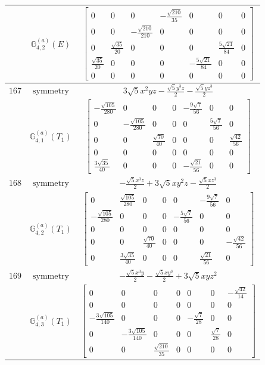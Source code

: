 \documentclass[fleqn,8pt,landscape]{jsarticle}
\begin{document}
\begin{longtable}{ccc}
$  $ & $ \mathbb{G}_{4,2}^{(a)}(E) $ & $ \begin{bmatrix} 0 & 0 & 0 & - \frac{\sqrt{210}}{35} & 0 & 0 & 0 \\ 0 & 0 & - \frac{\sqrt{210}}{210} & 0 & 0 & 0 & 0 \\ 0 & \frac{\sqrt{35}}{20} & 0 & 0 & 0 & \frac{5 \sqrt{21}}{84} & 0 \\ \frac{\sqrt{35}}{20} & 0 & 0 & 0 & - \frac{5 \sqrt{21}}{84} & 0 & 0 \\ 0 & 0 & 0 & 0 & 0 & 0 & 0 \end{bmatrix} $ \\ \hline
$ 167 $ & $ \text{symmetry} $ & $ 3 \sqrt{5} x^{2} y z - \frac{\sqrt{5} y^{3} z}{2} - \frac{\sqrt{5} y z^{3}}{2} $ \\
$  $ & $ \mathbb{G}_{4,1}^{(a)}(T_{1}) $ & $ \begin{bmatrix} - \frac{\sqrt{105}}{280} & 0 & 0 & 0 & - \frac{9 \sqrt{7}}{56} & 0 & 0 \\ 0 & - \frac{\sqrt{105}}{280} & 0 & 0 & 0 & \frac{5 \sqrt{7}}{56} & 0 \\ 0 & 0 & \frac{\sqrt{70}}{40} & 0 & 0 & 0 & \frac{\sqrt{42}}{56} \\ 0 & 0 & 0 & 0 & 0 & 0 & 0 \\ \frac{3 \sqrt{35}}{40} & 0 & 0 & 0 & - \frac{\sqrt{21}}{56} & 0 & 0 \end{bmatrix} $ \\ \hline
$ 168 $ & $ \text{symmetry} $ & $ - \frac{\sqrt{5} x^{3} z}{2} + 3 \sqrt{5} x y^{2} z - \frac{\sqrt{5} x z^{3}}{2} $ \\
$  $ & $ \mathbb{G}_{4,2}^{(a)}(T_{1}) $ & $ \begin{bmatrix} 0 & \frac{\sqrt{105}}{280} & 0 & 0 & 0 & - \frac{9 \sqrt{7}}{56} & 0 \\ - \frac{\sqrt{105}}{280} & 0 & 0 & 0 & - \frac{5 \sqrt{7}}{56} & 0 & 0 \\ 0 & 0 & 0 & 0 & 0 & 0 & 0 \\ 0 & 0 & \frac{\sqrt{70}}{40} & 0 & 0 & 0 & - \frac{\sqrt{42}}{56} \\ 0 & \frac{3 \sqrt{35}}{40} & 0 & 0 & 0 & \frac{\sqrt{21}}{56} & 0 \end{bmatrix} $ \\ \hline
$ 169 $ & $ \text{symmetry} $ & $ - \frac{\sqrt{5} x^{3} y}{2} - \frac{\sqrt{5} x y^{3}}{2} + 3 \sqrt{5} x y z^{2} $ \\
$  $ & $ \mathbb{G}_{4,3}^{(a)}(T_{1}) $ & $ \begin{bmatrix} 0 & 0 & 0 & 0 & 0 & 0 & - \frac{\sqrt{42}}{14} \\ 0 & 0 & 0 & 0 & 0 & 0 & 0 \\ - \frac{3 \sqrt{105}}{140} & 0 & 0 & 0 & - \frac{\sqrt{7}}{28} & 0 & 0 \\ 0 & - \frac{3 \sqrt{105}}{140} & 0 & 0 & 0 & \frac{\sqrt{7}}{28} & 0 \\ 0 & 0 & \frac{\sqrt{210}}{35} & 0 & 0 & 0 & 0 \end{bmatrix} $ \\ \hline

\end{longtable}
\end{document}
